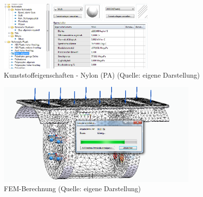 \begin{figure}[!h]  %
	\centering\includegraphics[width=0.7\textwidth]{images/FEM2.png}
	\caption{Kunststoffeigenschaften - Nylon (PA) \newline (Quelle: eigene Darstellung)}
	\label{FEM2} %
\end{figure}

\begin{figure}[!h]  %
	\centering\includegraphics[width=0.9\textwidth]{images/FEM.png}
	\caption{FEM-Berechnung \newline (Quelle: eigene Darstellung)}
	\label{FEM1} %
\end{figure}



